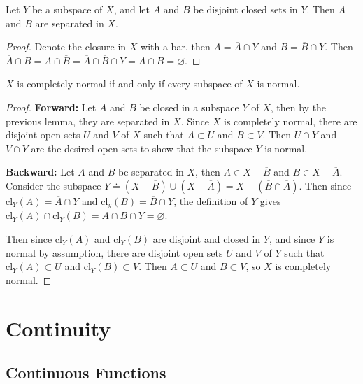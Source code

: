 \documentclass[10pt]{report}
\begin{document}
\begin{lem}
	Let $Y$ be a subspace of $X$, and let $A$ and $B$ be disjoint closed sets in $Y$. Then $A$ and $B$ are separated in $X$.
\end{lem}
\begin{proof}
	Denote the closure in $X$ with a bar, then $A=\overline{A} \cap Y$ and $B = \overline{B}\cap Y$. Then $\overline{A} \cap B = A \cap \overline{B}= \overline{A}\cap \overline{B}\cap Y = A \cap B = \varnothing$.
\end{proof}

\begin{prop}
$X$ is completely normal if and only if every subspace of $X$ is normal.
\end{prop}
\begin{proof}
\textbf{Forward:} Let $A$ and $B$ be closed in a subspace $Y$ of $X$, then by the previous lemma, they are separated in $X$. Since $X$ is completely normal, there are disjoint open sets $U$ and $V$ of $X$ such that $A \subset U$ and $B \subset V$. Then $U \cap Y$ and $V\cap Y$ are the desired open sets to show that the subspace $Y$ is normal.

\textbf{Backward:} Let $A$ and $B$ be separated in $X$, then $A \in X- \overline{B}$ and $B \in X-\overline{A}$. Consider the subspace $Y \doteq (X-\overline{B}) \cup (X-\overline{A}) = X - (\overline{B} \cap \overline{A})$. Then since $\text{cl}_Y(A) = \overline{A}\cap Y$ and $\text{cl}_y(B) = \overline{B}\cap Y$, the definition of $Y$ gives $\text{cl}_Y(A) \cap \text{cl}_Y(B) = \overline{A} \cap \overline{B} \cap Y = \varnothing$.

Then since $\text{cl}_Y(A)$ and $\text{cl}_Y(B)$ are disjoint and closed in $Y$, and since $Y$ is normal by assumption, there are disjoint open sets $U$ and $V$ of $Y$ such that $\text{cl}_Y(A) \subset U$ and $\text{cl}_Y(B) \subset V$. Then $A \subset U$ and $B \subset V$, so $X$ is completely normal.
\end{proof}



\chapter{Continuity}


\section{Continuous Functions}
\end{document}
